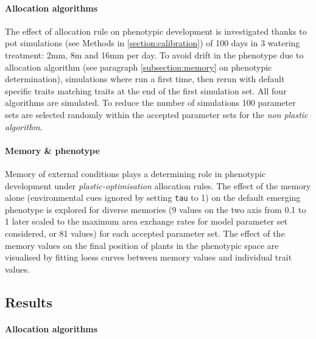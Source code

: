 \paragraph{Allocation algorithms}
The effect of allocation rule on phenotypic development is investigated thanks to pot simulations (see Methods in \ref{section:calibration}) of 100 days in 3 watering treatment: 2mm, 8m and 16mm per day. To avoid drift in the phenotype due to allocation algorithm (see paragraph \ref{subsection:memory} on phenotypic determination), simulations where run a first time, then rerun with default specific traits matching traits at the end of the first simulation set. All four algorithms are simulated. To reduce the number of simulations 100 parameter sets are selected randomly within the accepted parameter sets for the \textit{non plastic algorithm}.

\paragraph{Memory \& phenotype}
Memory of external conditions plays a determining role in phenotypic development under \textit{plastic-optimisation} allocation rules. The effect of the memory alone (environmental cues ignored by setting \texttt{tau} to 1) on the default emerging phenotype is explored for diverse memories (9 values on the two axis from 0.1 to 1 later scaled to the maximum area exchange rates for model parameter set considered, or 81 values) for each accepted parameter set. The effect of the memory values on the final position of plants in the phenotypic space are visualised by fitting loess curves between memory values and individual trait values.

\subsection{Results}

\paragraph{Allocation algorithms}

